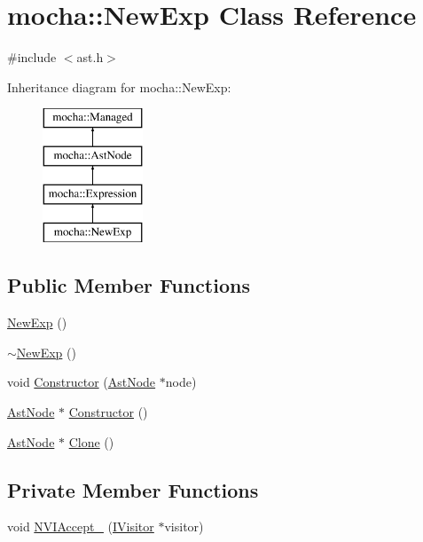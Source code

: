 \hypertarget{classmocha_1_1_new_exp}{
\section{mocha::NewExp Class Reference}
\label{classmocha_1_1_new_exp}
}


{\ttfamily \#include $<$ast.h$>$}

Inheritance diagram for mocha::NewExp:\begin{figure}[H]
\begin{center}
\leavevmode
\includegraphics[height=4.000000cm]{classmocha_1_1_new_exp}
\end{center}
\end{figure}
\subsection*{Public Member Functions}
\begin{DoxyCompactItemize}
\item 
\hyperlink{classmocha_1_1_new_exp_aec0e422023c38d6c1167d9506ebd342d}{NewExp} ()
\item 
\hyperlink{classmocha_1_1_new_exp_a50207d574bdc3bf4a280fbd266394007}{$\sim$NewExp} ()
\item 
void \hyperlink{classmocha_1_1_new_exp_aa7556ed99e78e22e694b163ec74e8589}{Constructor} (\hyperlink{classmocha_1_1_ast_node}{AstNode} $\ast$node)
\item 
\hyperlink{classmocha_1_1_ast_node}{AstNode} $\ast$ \hyperlink{classmocha_1_1_new_exp_aadab4c740aa487199140cb5e0d1fe153}{Constructor} ()
\item 
\hyperlink{classmocha_1_1_ast_node}{AstNode} $\ast$ \hyperlink{classmocha_1_1_new_exp_ad256abe9b71be99dd2a24be71e088691}{Clone} ()
\end{DoxyCompactItemize}
\subsection*{Private Member Functions}
\begin{DoxyCompactItemize}
\item 
void \hyperlink{classmocha_1_1_new_exp_a7e122b87c42c0589dc373db568650e80}{NVIAccept\_\-} (\hyperlink{classmocha_1_1_i_visitor}{IVisitor} $\ast$visitor)
\end{DoxyCompactItemize}
